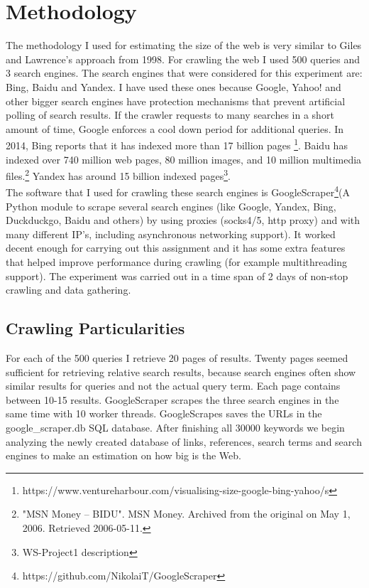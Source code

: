 \documentclass{sig-alternate}
\begin{document}
\section{Methodology}

The methodology I used for estimating the size of the web is very similar to Giles and Lawrence's approach from 1998. For crawling the web I used 500 queries and 3 search engines. The search engines that were considered for this experiment are: Bing, Baidu and Yandex. I have used these ones because Google, Yahoo! and other bigger search engines have protection mechanisms that prevent artificial polling of search results. If the crawler requests to many searches in a short amount of time, Google enforces a cool down period for additional queries. In 2014, Bing reports that it has indexed more than 17 billion pages \footnote{https://www.ventureharbour.com/visualising-size-google-bing-yahoo/s}. Baidu has indexed over 740 million web pages, 80 million images, and 10 million multimedia files.\footnote{"MSN Money – BIDU". MSN Money. Archived from the original on May 1, 2006. Retrieved 2006-05-11.} Yandex has around 15 billion indexed pages\footnote{WS-Project1 description}.\\

The software that I used for crawling these search engines is GoogleScraper\footnote{https://github.com/NikolaiT/GoogleScraper}(A Python module to scrape several search engines (like Google, Yandex, Bing, Duckduckgo, Baidu and others) by using proxies (socks4/5, http proxy) and with many different IP's, including asynchronous networking support). It worked decent enough for carrying out this assignment and it has some extra features that helped improve performance during crawling (for example multithreading support). The experiment was carried out in a time span of 2 days of non-stop crawling and data gathering.\\ 

\subsection{Crawling Particularities}

For each of the 500 queries I retrieve 20 pages of results. Twenty pages seemed sufficient for retrieving relative search results, because search engines often show similar results for queries and not the actual query term. Each page contains between 10-15 results. GoogleScraper scrapes the three search engines in the same time with 10 worker threads. GoogleScrapes saves the URLs in the google\_scraper.db SQL database. After finishing all 30000 keywords we begin analyzing the newly created database of links, references, search terms and search engines to make an estimation on how big is the Web.\\
\end{document}
